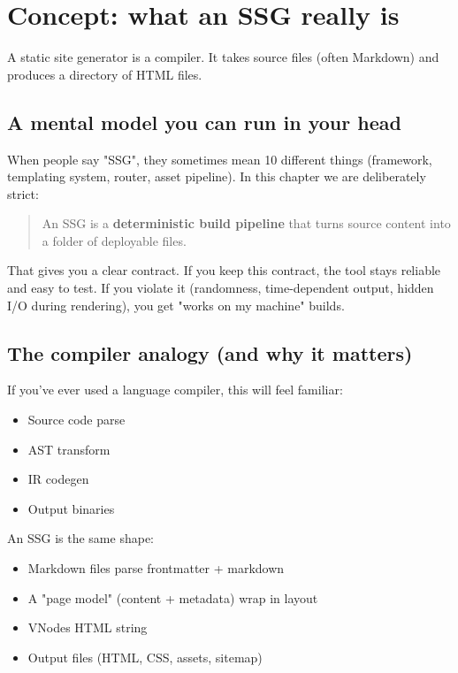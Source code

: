 \section{Concept: what an SSG really is}
A static site generator is a compiler.
It takes source files (often Markdown) and produces a directory of HTML files.

\subsection{A mental model you can run in your head}
When people say "SSG", they sometimes mean 10 different things (framework, templating system, router, asset pipeline).
In this chapter we are deliberately strict:

\begin{quote}
An SSG is a \textbf{deterministic build pipeline} that turns source content into a folder of deployable files.
\end{quote}

That gives you a clear contract.
If you keep this contract, the tool stays reliable and easy to test.
If you violate it (randomness, time-dependent output, hidden I/O during rendering), you get "works on my machine" builds.

\subsection{The compiler analogy (and why it matters)}
If you've ever used a language compiler, this will feel familiar:

\begin{itemize}
  \item Source code \textrightarrow parse 
  \item AST \textrightarrow transform
  \item IR \textrightarrow codegen
  \item Output binaries
\end{itemize}

An SSG is the same shape:

\begin{itemize}
  \item Markdown files \textrightarrow parse frontmatter + markdown
  \item A "page model" (content + metadata) \textrightarrow wrap in layout
  \item VNodes \textrightarrow HTML string
  \item Output files (HTML, CSS, assets, sitemap)
\end{itemize}

